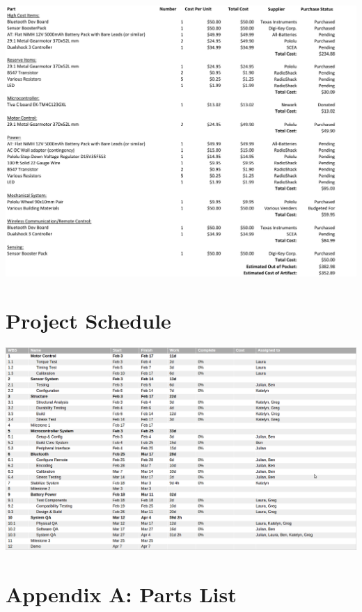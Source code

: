 \documentclass[11pt]{report}
\begin{document}
\begin{spacing}{1.5}
    {
    \centering
    \includegraphics[width=\textwidth]{CostAccounting}
    }

\section*{Project Schedule} %

    {
    \centering
    \includegraphics[width=\textwidth]{Schedule}
    }

{}

\clearpage

\section*{Appendix A: Parts List}

\begin{table}[H]


\end{table}
\end{spacing}
\end{document}
